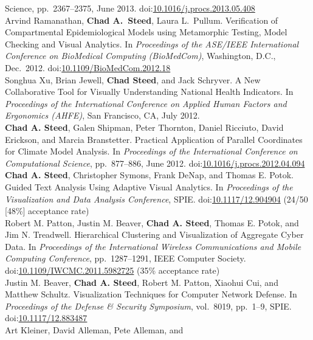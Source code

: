 \documentclass[11pt, a4paper]{article}
\newcommand{\amper}{{\fontspec[Scale=.95]{Hoefler Text}\selectfont\itshape\&}}
\newcommand{\years}[1]{\marginnote{\scriptsize #1}}
\begin{document}
\begin{sloppypar}
{Science}, pp.\ 2367--2375, June 2013.
doi:\href{http://dx.doi.org/10.1016/j.procs.2013.05.408}{10.1016/j.procs.2013.05.408} \\
\years{2012}Arvind Ramanathan, \textbf{Chad A.\ Steed}, Laura L.\ Pullum.
Verification of Compartmental Epidemiological Models using Metamorphic Testing,
Model Checking and Visual Analytics. In \emph{Proceedings of the ASE/IEEE International
Conference on BioMedical Computing (BioMedCom)}, Washington, D.C., Dec.\ 2012.
doi:\href{http://dx.doi.org/10.1109/BioMedCom.2012.18}{10.1109/BioMedCom.2012.18} \\
\years{2012}Songhua Xu, Brian Jewell, \textbf{Chad Steed},
and Jack Schryver. A New Collaborative Tool for Visually Understanding
National Health Indicators. In \emph{Proceedings of the International
Conference on Applied Human Factors and Ergonomics (AHFE)}, San Francisco, CA,
July 2012.\\
\years{2012}\textbf{Chad A. Steed}, Galen Shipman, Peter Thornton, Daniel Ricciuto,
David Erickson, and Marcia Branstetter.  Practical Application of Parallel Coordinates for
Climate Model Analysis. In \emph{Proceedings of the International Conference on Computational
Science}, pp.\ 877--886, June 2012.
doi:\href{http://dx.doi.org/10.1016/j.procs.2012.04.094}
{10.1016/j.procs.2012.04.094} \\
\years{2012}\textbf{Chad A. Steed}, Christopher Symons, Frank DeNap, and
Thomas E. Potok. Guided Text Analysis Using Adaptive Visual Analytics. In
\emph{Proceedings of the Visualization and Data Analysis Conference}, SPIE.
doi:\href{http://dx.doi.org/10.1117/12.904904}{10.1117/12.904904} (24/50 [48\%] acceptance rate)\\
\years{2011}Robert M. Patton, Justin M. Beaver, \textbf{Chad A. Steed},
Thomas E. Potok, and Jim N. Treadwell. Hierarchical Clustering and
Visualization of Aggregate Cyber Data. In \emph{Proceedings of the International
Wireless Communications and Mobile Computing Conference}, pp.\ 1287--1291,
IEEE Computer Society. doi:\href{http://dx.doi.org/10.1109/IWCMC.2011.5982725}
{10.1109/IWCMC.2011.5982725} (35\% acceptance rate)\\
\years{2011}Justin M. Beaver, \textbf{Chad A. Steed}, Robert M. Patton,
Xiaohui Cui, and Matthew Schultz. Visualization Techniques for Computer
Network Defense. In \emph{Proceedings of the Defense \amper{} Security
Symposium}, vol.\ 8019, pp.\ 1--9, SPIE.
doi:\href{http://dx.doi.org/10.1117/12.883487} {10.1117/12.883487}\\
\years{2009}Art Kleiner, David Alleman, Pete Alleman, and

\end{sloppypar}
\end{document}
